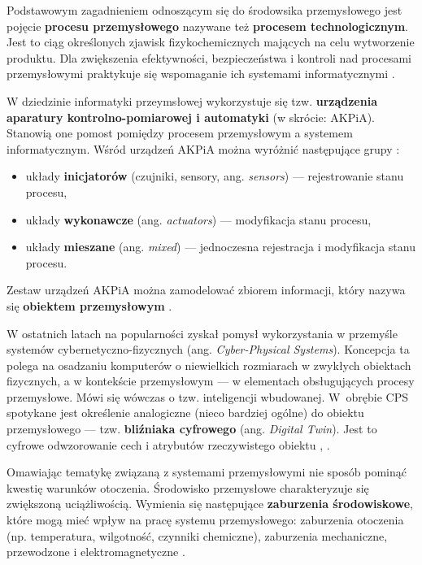 \documentclass[a4paper, 12pt, twoside]{article}
\begin{document}
Podstawowym zagadnieniem odnoszącym się do środowsika przemysłowego jest pojęcie
\textbf{procesu przemysłowego} nazywane też \textbf{procesem technologicznym}.
Jest to ciąg określonych zjawisk fizykochemicznych mających na celu wytworzenie
produktu. Dla zwiększenia efektywności, bezpieczeństwa i kontroli nad procesami
przemysłowymi praktykuje się wspomaganie ich systemami informatycznymi \cite{isp}.

W dziedzinie informatyki przeymsłowej wykorzystuje się tzw.
\textbf{urządzenia aparatury kontrolno-pomiarowej i automatyki} (w skrócie: AKPiA).
Stanowią one pomost pomiędzy procesem przemysłowym a systemem informatycznym.
Wśród urządzeń AKPiA można wyróżnić następujące grupy \cite{isp}:
\begin{itemize}
      \itemsep0em
      \item układy \textbf{inicjatorów} (czujniki, sensory, ang. \emph{sensors}) --- rejestrowanie stanu procesu,
      \item układy \textbf{wykonawcze} (ang. \emph{actuators}) --- modyfikacja stanu procesu,
      \item układy \textbf{mieszane} (ang. \emph{mixed}) --- jednoczesna rejestracja i modyfikacja stanu procesu.
\end{itemize}

\noindent Zestaw urządzeń AKPiA można zamodelować zbiorem informacji, który nazywa się
\textbf{obiektem przemysłowym} \cite{isp}.

W ostatnich latach na popularności zyskał pomysł wykorzystania
w przemyśle systemów cybernetyczno-fizycznych
(ang. \emph{Cyber-Physical Systems}). Koncepcja ta polega na osadzaniu
komputerów o niewielkich rozmiarach w zwykłych obiektach fizycznych, a w kontekście
przemysłowym --- w elementach obsługujących procesy przemysłowe. Mówi się
wówczas o tzw. inteligencji wbudowanej. W~obrębie
CPS spotykane jest określenie analogiczne (nieco bardziej ogólne) do obiektu przemysłowego ---
tzw. \textbf{bliźniaka cyfrowego} (ang. \emph{Digital Twin}). Jest to
cyfrowe odwzorowanie cech i atrybutów rzeczywistego obiektu \cite{isp}, \cite{iiot-challenges-opportunities-directions}.


Omawiając tematykę związaną z systemami przemysłowymi nie sposób pominąć kwestię
warunków otoczenia. Środowisko przemysłowe charakteryzuje się zwiększoną uciążliwością.
Wymienia się następujące \textbf{zaburzenia środowiskowe}, które mogą mieć wpływ na pracę
systemu przemysłowego: zaburzenia otoczenia (np. temperatura, wilgotność, czynniki chemiczne),
zaburzenia mechaniczne, przewodzone i elektromagnetyczne \cite{isp}.
\end{document}
